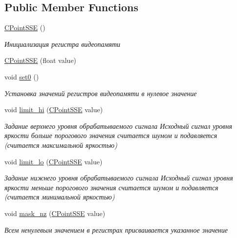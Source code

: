 \subsection*{Public Member Functions}
\begin{DoxyCompactItemize}
\item 
\hyperlink{class_c_point_s_s_e_ade2da0d5d55a42f93b516b351da78bcc}{C\+Point\+S\+S\+E} ()
\begin{DoxyCompactList}\small\item\em Инициализация регистра видеопамяти \end{DoxyCompactList}\item 
\hyperlink{class_c_point_s_s_e_abd611f212d90b86e7d64e35ed0028b23}{C\+Point\+S\+S\+E} (float value)
\item 
void \hyperlink{class_c_point_s_s_e_a8a516dcceb3bf62c514b98161fbee9e8}{set0} ()
\begin{DoxyCompactList}\small\item\em Установка значений регистров видеопамяти в нулевое значение \end{DoxyCompactList}\item 
void \hyperlink{class_c_point_s_s_e_aaf16570e1b45b827b2daf5cc7a72e1b5}{limit\+\_\+hi} (\hyperlink{class_c_point_s_s_e}{C\+Point\+S\+S\+E} value)
\begin{DoxyCompactList}\small\item\em Задание верхнего уровня обрабатываемого сигнала Исходный сигнал уровня яркости больше порогового значения считается шумом и подавляется (считается максимальной яркостью) \end{DoxyCompactList}\item 
void \hyperlink{class_c_point_s_s_e_a1e340ea125461e31714dc68825ef15cc}{limit\+\_\+lo} (\hyperlink{class_c_point_s_s_e}{C\+Point\+S\+S\+E} value)
\begin{DoxyCompactList}\small\item\em Задание нижнего уровня обрабатываемого сигнала Исходный сигнал уровня яркости меньше порогового значения считается шумом и подавляется (считается минимальной яркостью) \end{DoxyCompactList}\item 
void \hyperlink{class_c_point_s_s_e_a51947ec82f02f89fc6774c8c5a6d77c0}{mask\+\_\+nz} (\hyperlink{class_c_point_s_s_e}{C\+Point\+S\+S\+E} value)
\begin{DoxyCompactList}\small\item\em Всем ненулевым значением в регистрах присваивается указанное значение \end{DoxyCompactList}\item 

\end{DoxyCompactItemize}
